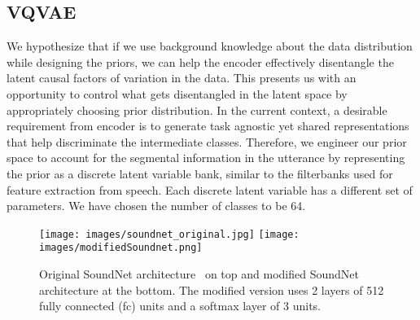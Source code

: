 \iffalse
The model needs to do two things: (1) Encode the textual representations from different languages into a universal format and (2) Put the speaker dependent factors of variation in the decoder. 
\subsection{A Case for controlled disentanglement of attributes}

We believe that complete disentanglement of input data into its independent causal factors of variation is not fully useful. A more attractive option is to employ priors about the causal factors of variation and control what gets disentangled. This can also be seen as a way of incorporating inductive bias into the model. This was always the case in supervised learning anyway. The idea is to do away with the nuisance variables. Typical priors used today however, are generic and include every factor of variation. This is not only less useful but also leads to an average performance. A manifestation of this can be seen in the spoilt reconstruction ability of the models that use global priors. Instead of weakening the decoder for covering the reconstruction, we can flip the equation and force the encoder to encode only information required by the decoder, employing the prior to accurately solve the task at hand.  
\fi


\subsection{VQVAE}
We hypothesize that if we use background knowledge about the data distribution while designing the priors, we can help the encoder effectively disentangle the latent causal factors of variation in the data. This presents us with an opportunity to control what gets disentangled in the latent space by appropriately choosing prior distribution. In the current context, a desirable requirement from encoder is to generate task agnostic yet shared representations that help discriminate the intermediate classes. Therefore, we engineer our prior space to account for the segmental information in the utterance by representing the prior as a discrete latent variable bank, similar to the filterbanks used for feature extraction from speech. Each discrete latent variable has a different set of parameters. We have chosen the number of classes to be 64. 






\begin{figure}[t]
  \centering
  \texttt{[image: images/soundnet\_original.jpg]}
  \texttt{[image: images/modifiedSoundnet.png]}
  \caption{Original SoundNet architecture~\cite{aytar2016soundnet} on top and modified SoundNet architecture at the bottom. The modified version uses 2 layers of 512 fully connected (fc) units and a softmax layer of 3 units.}
  \label{embedding_extraction}
\end{figure}






